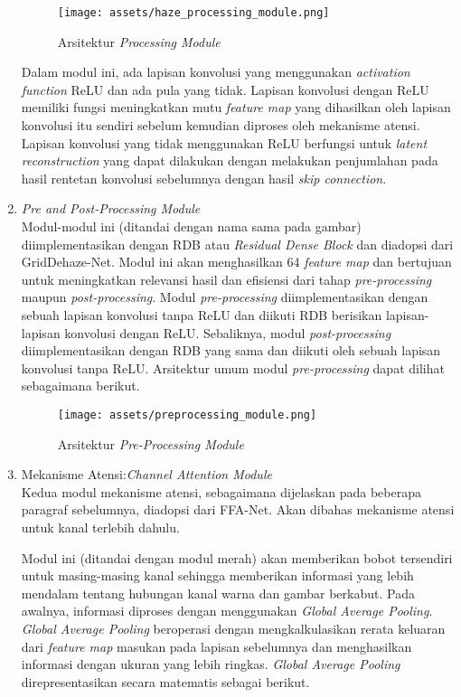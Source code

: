 \documentclass[11pt, a4paper, final]{report}
\begin{document}
\begin{enumerate}
    \begin{figure}[htbp]
    \centering
    \texttt{[image: assets/haze\_processing\_module.png]}
    \caption{Arsitektur \textit{Processing Module}}
    \end{figure}
    
    Dalam modul ini, ada lapisan konvolusi yang menggunakan \textit{activation function} ReLU dan ada pula yang tidak. Lapisan konvolusi dengan ReLU memiliki fungsi meningkatkan mutu \textit{feature map} yang dihasilkan oleh lapisan konvolusi itu sendiri sebelum kemudian diproses oleh mekanisme atensi. Lapisan konvolusi yang tidak menggunakan ReLU berfungsi untuk \textit{latent reconstruction} yang dapat dilakukan dengan melakukan penjumlahan pada hasil rentetan konvolusi sebelumnya dengan hasil \textit{skip connection}.
    
    \item \textit{Pre and Post-Processing Module}\\
    Modul-modul ini (ditandai dengan nama sama pada gambar) diimplementasikan dengan RDB atau \textit{Residual Dense Block} dan diadopsi dari GridDehaze-Net. Modul ini akan menghasilkan 64 \textit{feature map} dan bertujuan untuk meningkatkan relevansi hasil dan efisiensi dari tahap \textit{pre-processing} maupun \textit{post-processing}. Modul \textit{pre-processing} diimplementasikan dengan sebuah lapisan konvolusi tanpa ReLU dan diikuti RDB berisikan lapisan-lapisan konvolusi dengan ReLU. Sebaliknya, modul \textit{post-processing} diimplementasikan dengan RDB yang sama dan diikuti oleh sebuah lapisan konvolusi tanpa ReLU. Arsitektur umum modul \textit{pre-processing} dapat dilihat sebagaimana berikut.
    
    \begin{figure}[htbp]
    \centering
    \texttt{[image: assets/preprocessing\_module.png]}
    \caption{Arsitektur \textit{Pre-Processing Module}}
    \end{figure}
    
    \item Mekanisme Atensi:\textit{Channel Attention Module}\\
    Kedua modul mekanisme atensi, sebagaimana dijelaskan pada beberapa paragraf sebelumnya, diadopsi dari FFA-Net. Akan dibahas mekanisme atensi untuk kanal terlebih dahulu.
    
    Modul ini (ditandai dengan modul merah) akan memberikan bobot tersendiri untuk masing-masing kanal sehingga memberikan informasi yang lebih mendalam tentang hubungan kanal warna dan gambar berkabut. Pada awalnya, informasi diproses dengan menggunakan \textit{Global Average Pooling}. \textit{Global Average Pooling} beroperasi dengan mengkalkulasikan rerata keluaran dari \textit{feature map} masukan pada lapisan sebelumnya dan menghasilkan informasi dengan ukuran yang lebih ringkas. \textit{Global Average Pooling} direpresentasikan secara matematis sebagai berikut.
    

\end{enumerate}
\end{document}
